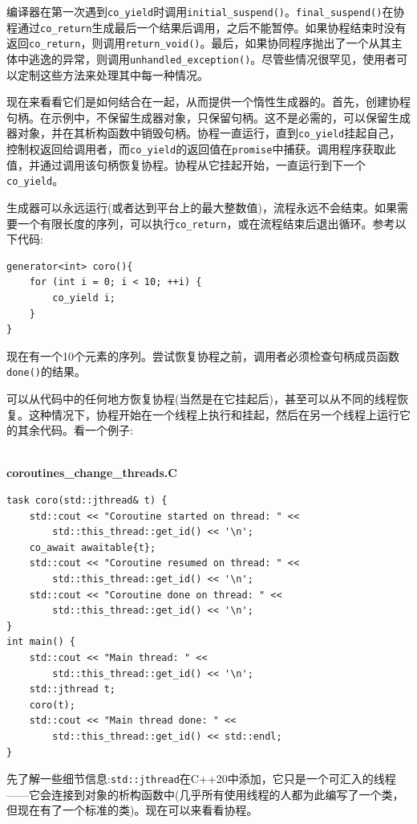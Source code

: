 编译器在第一次遇到\texttt{co\_yield}时调用\texttt{initial\_suspend()}。\texttt{final\_suspend()}在协程通过\texttt{co\_return}生成最后一个结果后调用，之后不能暂停。如果协程结束时没有返回\texttt{co\_return}，则调用\texttt{return\_void()}。最后，如果协同程序抛出了一个从其主体中逃逸的异常，则调用\texttt{unhandled\_exception()}。尽管些情况很罕见，使用者可以定制这些方法来处理其中每一种情况。

现在来看看它们是如何结合在一起，从而提供一个惰性生成器的。首先，创建协程句柄。在示例中，不保留生成器对象，只保留句柄。这不是必需的，可以保留生成器对象，并在其析构函数中销毁句柄。协程一直运行，直到\texttt{co\_yield}挂起自己，控制权返回给调用者，而\texttt{co\_yield}的返回值在\texttt{promise}中捕获。调用程序获取此值，并通过调用该句柄恢复协程。协程从它挂起开始，一直运行到下一个\texttt{co\_yield}。 

生成器可以永远运行(或者达到平台上的最大整数值)，流程永远不会结束。如果需要一个有限长度的序列，可以执行\texttt{co\_return}，或在流程结束后退出循环。参考以下代码:

\begin{lstlisting}[style=styleCXX]
generator<int> coro(){
	for (int i = 0; i < 10; ++i) {
		co_yield i;
	}
}
\end{lstlisting}

现在有一个10个元素的序列。尝试恢复协程之前，调用者必须检查句柄成员函数\texttt{done()}的结果。

可以从代码中的任何地方恢复协程(当然是在它挂起后)，甚至可以从不同的线程恢复。这种情况下，协程开始在一个线程上执行和挂起，然后在另一个线程上运行它的其余代码。看一个例子:

\hspace*{\fill} \\ %
\noindent
\textbf{coroutines\_change\_threads.C}
\begin{lstlisting}[style=styleCXX]
task coro(std::jthread& t) {
	std::cout << "Coroutine started on thread: " <<
		std::this_thread::get_id() << '\n';
	co_await awaitable{t};
    std::cout << "Coroutine resumed on thread: " <<
		std::this_thread::get_id() << '\n';
	std::cout << "Coroutine done on thread: " <<
		std::this_thread::get_id() << '\n';
}
int main() {
	std::cout << "Main thread: " <<
		std::this_thread::get_id() << '\n';
	std::jthread t;
	coro(t);
	std::cout << "Main thread done: " << 
		std::this_thread::get_id() << std::endl;
}
\end{lstlisting}

先了解一些细节信息:\texttt{std::jthread}在C++20中添加，它只是一个可汇入的线程——它会连接到对象的析构函数中(几乎所有使用线程的人都为此编写了一个类，但现在有了一个标准的类)。现在可以来看看协程。 


